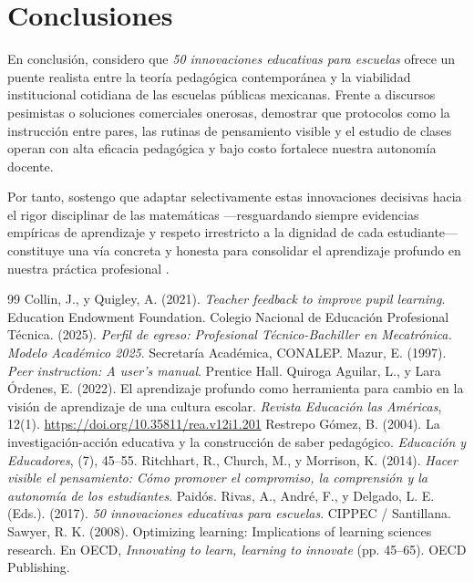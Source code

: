 \documentclass[spanish,letterpaper,oneside]{article}
\begin{document}
\clearpage
\section{Conclusiones}
En conclusión, considero que \textit{50 innovaciones educativas para escuelas} \citep{rivas2017innovaciones} ofrece un puente realista entre la teoría pedagógica contemporánea y la viabilidad institucional cotidiana de las escuelas públicas mexicanas. Frente a discursos pesimistas o soluciones comerciales onerosas, demostrar que protocolos como la instrucción entre pares, las rutinas de pensamiento visible y el estudio de clases operan con alta eficacia pedagógica y bajo costo fortalece nuestra autonomía docente.

Por tanto, sostengo que adaptar selectivamente estas innovaciones decisivas hacia el rigor disciplinar de las matemáticas —resguardando siempre evidencias empíricas de aprendizaje y respeto irrestricto a la dignidad de cada estudiante— constituye una vía concreta y honesta para consolidar el aprendizaje profundo en nuestra práctica profesional \citep{quiroga2022aprendizaje}.

\clearpage
\begin{thebibliography}{99}
 Collin, J., y Quigley, A. (2021). \textit{Teacher feedback to improve pupil learning}. Education Endowment Foundation.
 Colegio Nacional de Educación Profesional Técnica. (2025). \textit{Perfil de egreso: Profesional Técnico-Bachiller en Mecatrónica. Modelo Académico 2025}. Secretaría Académica, CONALEP.
 Mazur, E. (1997). \textit{Peer instruction: A user's manual}. Prentice Hall.
 Quiroga Aguilar, L., y Lara Órdenes, E. (2022). El aprendizaje profundo como herramienta para cambio en la visión de aprendizaje de una cultura escolar. \textit{Revista Educación las Américas}, 12(1). \url{https://doi.org/10.35811/rea.v12i1.201}
 Restrepo Gómez, B. (2004). La investigación-acción educativa y la construcción de saber pedagógico. \textit{Educación y Educadores}, (7), 45--55.
 Ritchhart, R., Church, M., y Morrison, K. (2014). \textit{Hacer visible el pensamiento: Cómo promover el compromiso, la comprensión y la autonomía de los estudiantes}. Paidós.
 Rivas, A., André, F., y Delgado, L. E. (Eds.). (2017). \textit{50 innovaciones educativas para escuelas}. CIPPEC / Santillana.
 Sawyer, R. K. (2008). Optimizing learning: Implications of learning sciences research. En OECD, \textit{Innovating to learn, learning to innovate} (pp. 45--65). OECD Publishing.
\end{thebibliography}
\end{document}
